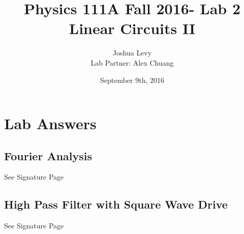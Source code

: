 \documentclass{article}
\title{Physics 111A Fall 2016- Lab 2\\
Linear Circuits II}
\author{Joshua Levy\\Lab Partner: Alex Chuang}
\date{September 9th, 2016}
\begin{document}
\maketitle

\section{Lab Answers}

\subsection{Fourier Analysis}
    See Signature Page

\subsection{High Pass Filter with Square Wave Drive}
    See Signature Page
\end{document}
